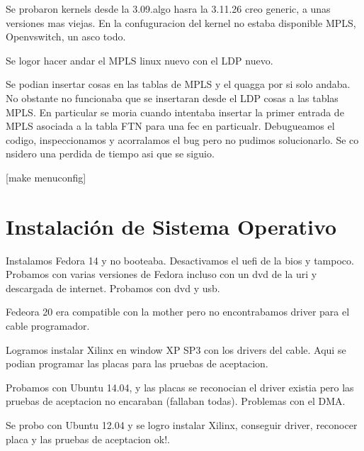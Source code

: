 Se probaron kernels desde la 3.09.algo hasra la 3.11.26 creo generic, a unas versiones mas viejas. En la confuguracion del kernel no estaba disponible MPLS, Openvswitch, un asco todo.

Se logor hacer andar el MPLS linux nuevo con el LDP nuevo.

Se podian insertar cosas en las tablas de MPLS y el quagga por si solo andaba. No obstante no funcionaba que se insertaran desde el LDP cosas a las tablas MPLS. En particular se moria cuando intentaba insertar la primer entrada de MPLS asociada a la tabla FTN para una fec en particualr. Debugueamos el codigo, inspeccionamos y acorralamos el bug pero no pudimos solucionarlo. Se co nsidero una perdida de tiempo asi que se siguio.

[make menuconfig]

\section{Instalaci\'on de Sistema Operativo}
Instalamos Fedora 14 y no booteaba. Desactivamos el uefi de la bios y tampoco. Probamos con varias versiones de Fedora incluso con un dvd de la uri y descargada de internet. Probamos con dvd y usb.

Fedeora 20 era compatible con la mother pero no encontrabamos driver para el cable programador.

Logramos instalar Xilinx en window XP SP3 con los drivers del cable. Aqui se podian programar las placas para las pruebas de aceptacion.

Probamos con Ubuntu 14.04, y las placas se reconocian el driver existia pero las pruebas de aceptacion no encaraban (fallaban todas). Problemas con el DMA.

Se probo con Ubuntu 12.04 y se logro instalar Xilinx, conseguir driver, reconocer placa y las pruebas de aceptacion ok!. 